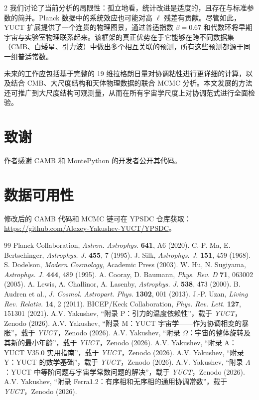\documentclass[11pt,a4paper]{article}
\begin{document}
\begin{multicols}{2}
		我们讨论了当前分析的局限性：孤立地看，统计改进是适度的，且存在与标准参数的简并。Planck 数据中的系统效应也可能对高 $\ell$ 残差有贡献。尽管如此，YUCT 扩展提供了一个连贯的物理图景，通过普适指数 $\beta = 0.67$ 和代数环将早期宇宙与实验室物理联系起来。该框架的真正优势在于它能够在跨不同数据集（CMB、白矮星、引力波）中做出多个相互关联的预测，所有这些预测都源于同一组普适常数。
		
		未来的工作应包括基于完整的 19 维拉格朗日量对协调粘性进行更详细的计算，以及结合 CMB、大尺度结构和天体物理数据的联合 MCMC 分析。本文发展的方法还可推广到大尺度结构可观测量，从而在所有宇宙学尺度上对协调范式进行全面检验。
		
		\section*{致谢}
		
		作者感谢 CAMB 和 MontePython 的开发者公开其代码。
		
		\section*{数据可用性}
		
		修改后的 CAMB 代码和 MCMC 链可在 YPSDC 仓库获取：\url{https://github.com/Alexey-Yakushev-YUCT/YPSDC}。
		
		\begin{thebibliography}{99}
			 Planck Collaboration, \emph{Astron. Astrophys.} \textbf{641}, A6 (2020).
			 C.-P. Ma, E. Bertschinger, \emph{Astrophys. J.} \textbf{455}, 7 (1995).
			 J. Silk, \emph{Astrophys. J.} \textbf{151}, 459 (1968).
			 S. Dodelson, \emph{Modern Cosmology}, Academic Press (2003).
			 W. Hu, N. Sugiyama, \emph{Astrophys. J.} \textbf{444}, 489 (1995).
			 A. Cooray, D. Baumann, \emph{Phys. Rev. D} \textbf{71}, 063002 (2005).
			 A. Lewis, A. Challinor, A. Lasenby, \emph{Astrophys. J.} \textbf{538}, 473 (2000).
			 B. Audren et al., \emph{J. Cosmol. Astropart. Phys.} \textbf{1302}, 001 (2013).
			 J.-P. Uzan, \emph{Living Rev. Relativ.} \textbf{14}, 2 (2011).
			 BICEP/Keck Collaboration, \emph{Phys. Rev. Lett.} \textbf{127}, 151301 (2021).
			 A.V. Yakushev, “附录 P：引力的温度依赖性”，载于 \emph{YUCT}，Zenodo (2026).
			 A.V. Yakushev, “附录 M：YUCT 宇宙学——作为协调相变的暴胀”，载于 \emph{YUCT}，Zenodo (2026).
			 A.V. Yakushev, “附录 $\Omega$：宇宙的整体旋转及其新的最小年龄”，载于 \emph{YUCT}，Zenodo (2026).
			 A.V. Yakushev, “附录 A：YUCT V35.0 实用指南”，载于 \emph{YUCT}，Zenodo (2026).
			 A.V. Yakushev, “附录 Y：YUCT 的数学基础”，载于 \emph{YUCT}，Zenodo (2026).
			 A.V. Yakushev, “附录 $\Lambda$：YUCT 中等阶问题与宇宙学常数问题的解决”，载于 \emph{YUCT}，Zenodo (2026).
			 A.V. Yakushev, “附录 Ferra1.2：有序相和无序相的通用协调常数”，载于 \emph{YUCT}，Zenodo (2026).
		\end{thebibliography}
		
	\end{multicols}
\end{document}
